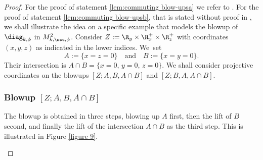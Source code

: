 \begin{proof}
For the proof of statement \eqref{lem:commuting blow-upsa} we refer to \cite[Lem.\,2.1]{analytic-surgery}.
For the proof of statement \eqref{lem:commuting blow-upsb}, that is stated without proof in \cite[Prop.\,5]{Mel-real}, we shall illustrate the idea on a specific example
that models the blowup of $\diag_{k,\phi}$ in $M^2_{k,\ssc,\phi}$. Consider $Z:=\R_y \times \R^+_x \times \R^+_z$
with coordinates $(x,y,z)$ as indicated in the lower indices.
We~set
\[
A:= \{x=z=0\} \quad \text{and} \quad B:= \{x=y=0\}.
\]
Their intersection is $A\cap B = \{x=0,\, y=0,\, z=0\}$. We shall consider projective
coordinates on the blowups $[Z; A, B, A \cap B]$ and $[Z; B, A, A \cap B]$.

\subsubsection*{Blowup $[Z; A, B, A \cap B]$}
The blowup is obtained in three steps, blowing up $A$ first,
then the lift of $B$ second, and finally the lift of the intersection $A\cap B$
as the third step. This is illustrated in Figure \ref{figure 9}.

\begin{figure}[htb]

\end{figure}
\end{proof}
